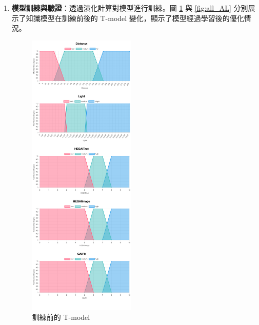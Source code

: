 \documentclass[twocolumn,11pt,a4paper]{article}
\begin{document}
\begin{enumerate}
    \item \textbf{模型訓練與驗證}：透過演化計算對模型進行訓練。圖 \ref{fig:all_BT} 與 \ref{fig:all_AL} 分別展示了知識模型在訓練前後的 T-model 變化，顯示了模型經過學習後的優化情況。
    \begin{figure}[htbp]
        \centering
        \includegraphics[width=0.48\textwidth]{res/image/all_BT.png}
        \caption{訓練前的 T-model}
        \label{fig:all_BT}
    \end{figure}
    \begin{figure}[htbp]
        \centering

\end{figure}
\end{enumerate}
\end{document}
